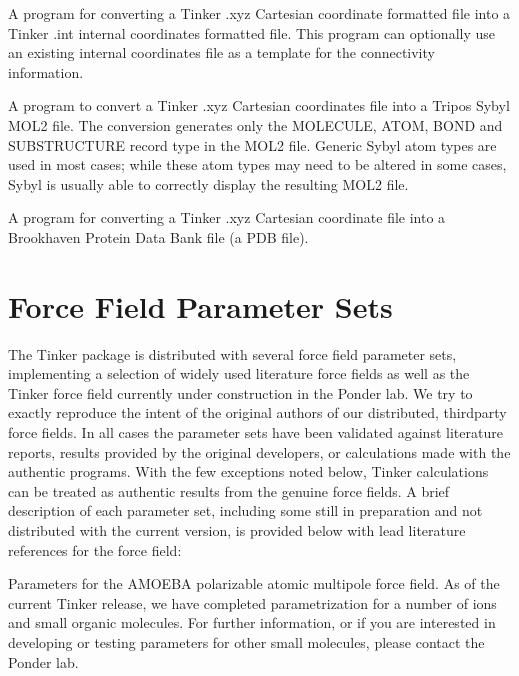 \documentclass[letterpaper,11pt,english]{sphinxmanual}
\begin{document}

A program for converting a Tinker .xyz Cartesian coordinate formatted file into a Tinker .int internal coordinates formatted file. This program can optionally use an existing internal coordinates file as a template for the connectivity information.


A program to convert a Tinker .xyz Cartesian coordinates file into a Tripos Sybyl MOL2 file. The conversion generates only the MOLECULE, ATOM, BOND and SUBSTRUCTURE record type in the MOL2 file. Generic Sybyl atom types are used in most cases; while these atom types may need to be altered in some cases, Sybyl is usually able to correctly display the resulting MOL2 file.


A program for converting a Tinker .xyz Cartesian coordinate file into a Brookhaven Protein Data Bank file (a PDB file).


\chapter{Force Field Parameter Sets}
\label{\detokenize{text/parameters:force-field-parameter-sets}}\label{\detokenize{text/parameters::doc}}
The Tinker package is distributed with several force field parameter sets, implementing a selection of widely used literature force fields as well as the Tinker force field currently under construction in the Ponder lab. We try to exactly reproduce the intent of the original authors of our distributed, third\sphinxhyphen{}party force fields. In all cases the parameter sets have been validated against literature reports, results provided by the original developers, or calculations made with the authentic programs. With the few exceptions noted below, Tinker calculations can be treated as authentic results from the genuine force fields. A brief description of each parameter set, including some still in preparation and not distributed with the current version, is provided below with lead literature references for the force field:


Parameters for the AMOEBA polarizable atomic multipole force field. As of the current Tinker release, we have completed parametrization for a number of ions and small organic molecules. For further information, or if you are interested in developing or testing parameters for other small molecules, please contact the Ponder lab.
\end{document}
